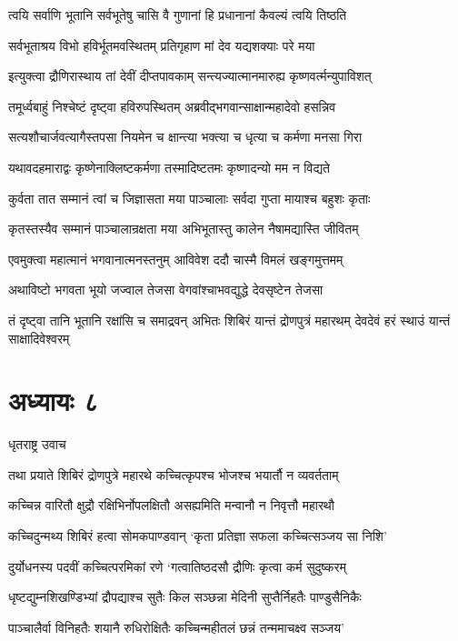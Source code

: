 \twolineshloka
{त्वयि सर्वाणि भूतानि सर्वभूतेषु चासि वै}
{गुणानां हि प्रधानानां कैवल्यं त्वयि तिष्ठति}


\twolineshloka
{सर्वभूताश्रय विभो हविर्भूतमवस्थितम्}
{प्रतिगृहाण मां देव यद्यशक्याः परे मया}


\twolineshloka
{इत्युक्त्वा द्रौणिरास्थाय तां देवीं दीप्तपावकाम्}
{सन्त्यज्यात्मानमारुह्य कृष्णवर्त्मन्युपाविशत्}


\twolineshloka
{तमूर्ध्वबाहुं निश्चेष्टं दृष्ट्वा हविरुपस्थितम्}
{अब्रवीद्भगवान्साक्षान्महादेवो हसन्निव}


\twolineshloka
{सत्यशौचार्जवत्यागैस्तपसा नियमेन च}
{क्षान्त्या भक्त्या च धृत्या च कर्मणा मनसा गिरा}


\twolineshloka
{यथावदहमाराद्वः कृष्णेनाक्लिष्टकर्मणा}
{तस्मादिष्टतमः कृष्णादन्यो मम न विद्यते}


\twolineshloka
{कुर्वता तात सम्मानं त्वां च जिज्ञासता मया}
{पाञ्चालाः सर्वदा गुप्ता मायाश्च बहुशः कृताः}


\twolineshloka
{कृतस्तस्यैव सम्मानं पाञ्चालान्रक्षता मया}
{अभिभूतास्तु कालेन नैषामद्यास्ति जीवितम्}


\twolineshloka
{एवमुक्त्वा महात्मानं भगवानात्मनस्तनुम्}
{आविवेश ददौ चास्मै विमलं खङ्गमुत्तमम्}


\twolineshloka
{अथाविष्टो भगवता भूयो जज्वाल तेजसा}
{वेगवांश्चाभवद्युद्धे देवसृष्टेन तेजसा}


\threelineshloka
{तं दृष्ट्वा तानि भूतानि रक्षांसि च समाद्रवन्}
{अभितः शिबिरं यान्तं द्रोणपुत्रं महारथम्}
{देवदेवं हरं स्थाउं यान्तं साक्षादिवेश्वरम्}


\chapter{अध्यायः ८}
\twolineshloka
{धृतराष्ट्र उवाच}
{}


\twolineshloka
{तथा प्रयाते शिबिरं द्रोणपुत्रे महारथे}
{कच्चित्कृपश्च भोजश्च भयार्तौ न व्यवर्तताम्}


\twolineshloka
{कच्चिन्न वारितौ क्षुद्रौ रक्षिभिर्नोपलक्षितौ}
{असह्यमिति मन्वानौ न निवृत्तौ महारथौ}


\twolineshloka
{कच्चिदुन्मथ्य शिबिरं हत्वा सोमकपाण्डवान्}
{`कृता प्रतिज्ञा सफला कच्चित्सञ्जय सा निशि'}


\twolineshloka
{दुर्योधनस्य पदवीं कच्चित्परमिकां रणे}
{`गत्वातिष्ठदसौ द्रौणिः कृत्वा कर्म सुदुष्करम्}


\twolineshloka
{धृष्टद्युम्नशिखण्डिभ्यां द्रौपद्याश्च सुतैः किल}
{सञ्छन्ना मेदिनी सुप्तैर्निहतैः पाण्डुसैनिकैः}


\twolineshloka
{पाञ्चालैर्वा विनिहतैः शयानै रुधिरोक्षितैः}
{कच्चिन्महीतलं छन्नं तन्ममाचक्ष्व सञ्जय'}


